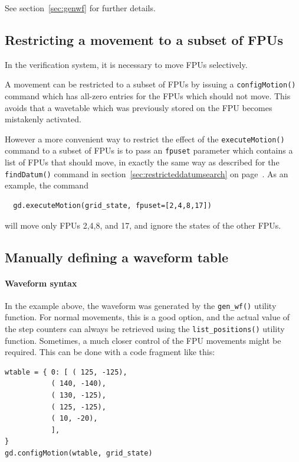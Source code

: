 \documentclass[fontsize=12,a4paper]{scrreprt}
\begin{document}
See section~\ref{sec:genwf} for further details.

\subsection{Restricting a movement to a subset of FPUs}
  In the verification system, it is necessary
to move FPUs selectively.

A movement can be restricted to a subset of FPUs by issuing a
\texttt{configMotion()} command which has all-zero entries for the FPUs
which should not move. This avoids that a wavetable which was
previously stored on the FPU becomes mistakenly activated.

However a more convenient way to restrict the effect
of the \texttt{executeMotion()} command to a
subset of FPUs is to pass an \texttt{fpuset} parameter
which contains a list of FPUs that should move,
in exactly the same way as described for the \texttt{findDatum()}
command in section~\ref{sec:restricteddatumsearch}
on page~\pageref{sec:restricteddatumsearch}. As an example,
the command
\begin{verbatim}
  gd.executeMotion(grid_state, fpuset=[2,4,8,17])
\end{verbatim}
will move only FPUs 2,4,8, and 17, and ignore the states of the other
FPUs.


\subsection{Manually defining a waveform table}
\label{sec:waveform_rules}
\paragraph{Waveform syntax}

In the example above, the waveform was generated by the
\texttt{gen\_wf()} utility function.  For normal movements, this is a
good option, and the actual value of the step counters can always be
retrieved using the \texttt{list\_positions()} utility
function. Sometimes, a much closer control of the FPU movements might
be required. This can be done with a code fragment like this:

\begin{verbatim}
wtable = { 0: [ ( 125, -125),
           ( 140, -140),
           ( 130, -125),
           ( 125, -125),
           ( 10, -20),
           ],
}
gd.configMotion(wtable, grid_state)
\end{verbatim}
\end{document}
